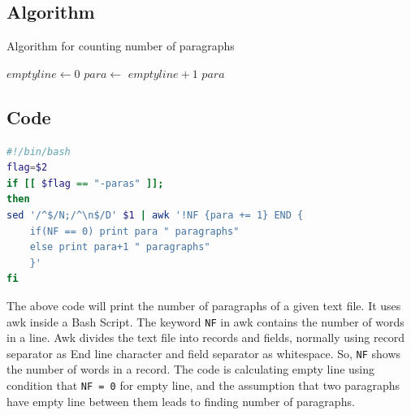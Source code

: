 \documentclass[12pt]{article}
\begin{document}
\subsection{Algorithm}
\begin{algorithm}[hbt!]
\caption{Algorithm for counting number of paragraphs}
\SetAlgoLined
{}
$emptyline \gets 0$\;
$para \gets$ $emptyline + 1$\;
\Print $para$\;
\end{algorithm}

\subsection{Code}
\begin{lstlisting}[language=bash,caption=Bash code using awk]
#!/bin/bash
flag=$2
if [[ $flag == "-paras" ]];
then
sed '/^$/N;/^\n$/D' $1 | awk '!NF {para += 1} END {
    if(NF == 0) print para " paragraphs"
    else print para+1 " paragraphs"
    }'
fi
\end{lstlisting}
\vspace{1 em}
The above code will print the number of paragraphs of a given text file. It uses awk inside a Bash Script. The keyword \texttt{NF} in awk contains the number of words in a line. Awk divides the text file into records and fields, normally using record separator as End line character and field separator as whitespace. So, \texttt{NF} shows the number of words in a record. The code is calculating empty line using condition that \texttt{NF = 0} for empty line, and the assumption that two paragraphs have empty line between them leads to finding number of paragraphs.

\newpage


\end{document}
